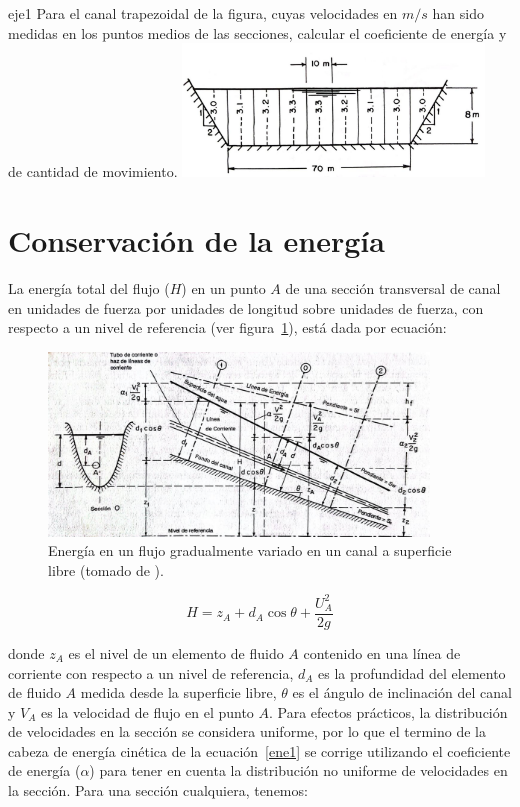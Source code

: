 \documentclass[11pt, oneside]{article}
\begin{document}
\begin{eje}{}{eje1}
    Para el canal trapezoidal de la figura, cuyas velocidades en $m/s$ han sido medidas en los puntos medios de las secciones, calcular el coeficiente de energ\'ia y de cantidad de movimiento.
    \includegraphics[width=8cm]{fig118.jpeg} %
\end{eje}


\section{Conservaci\'on de la energ\'ia}%
La energ\'ia total del flujo ($H$) en un punto $A$ de una secci\'on transversal de canal en unidades de fuerza por unidades de longitud sobre unidades de fuerza, con respecto a un nivel de referencia (ver figura~\ref{fig9}), est\'a dada por ecuaci\'on:

\begin{figure}[h]
\centering
\includegraphics[width=0.9\textwidth]{fig31.jpeg}
\caption{Energ\'ia en un flujo gradualmente variado en un canal a superficie libre (tomado de \cite{VChow}).}
\label{fig9}
\end{figure}

\begin{equation}
H = z_{A} + d_{A} \cos \theta + \frac{U_A^2}{2g} 
\label{ene1}
\end{equation}

donde $z_A$ es el nivel de un elemento de fluido $A$ contenido en una l\'inea de corriente con respecto a un nivel de referencia, $d_A$ es la profundidad del elemento de fluido $A$ medida desde la superficie libre, $\theta$ es el \'angulo de inclinaci\'on del canal y $V_A$ es la velocidad de flujo en el punto $A$. Para efectos pr\'acticos, la distribuci\'on de velocidades en la secci\'on se considera uniforme, por lo que el termino de la cabeza de energ\'ia cin\'etica de la ecuaci\'on~\ref{ene1} se corrige utilizando el coeficiente de energ\'ia ($\alpha$) para tener en cuenta la distribuci\'on no uniforme de velocidades en la secci\'on. Para una secci\'on cualquiera, tenemos:
\end{document}
